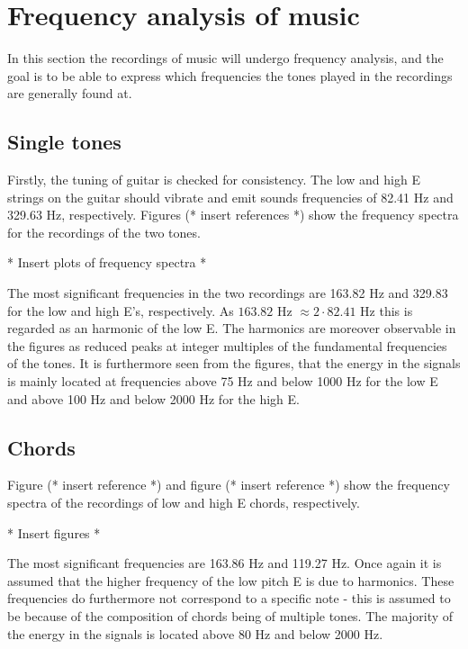 \section{Frequency analysis of music}
In this section the recordings of music will undergo frequency analysis, and the goal is to be able to express which frequencies the tones played in the recordings are generally found at.

\subsection{Single tones}\label{sec:single}
Firstly, the tuning of guitar is checked for consistency. The low and high E strings on the guitar should vibrate and emit sounds frequencies of 82.41 Hz and 329.63 Hz, respectively. Figures (* insert references *) show the frequency spectra for the recordings of the two tones.
\begin{center}
* Insert plots of frequency spectra *
\end{center}

The most significant frequencies in the two recordings are 163.82 Hz and 329.83 for the low and high E's, respectively. As $163.82$ Hz $\approx 2\cdot82.41$ Hz this is regarded as an harmonic of the low E. The harmonics are moreover observable in the figures as reduced peaks at integer multiples of the fundamental frequencies of the tones. It is furthermore seen from the figures, that the energy in the signals is mainly located at frequencies above 75 Hz and below 1000 Hz for the low E and above 100 Hz and below 2000 Hz for the high E.

\subsection{Chords}
Figure (* insert reference *) and figure (* insert reference *) show the frequency spectra of the recordings of low and high E chords, respectively.
\begin{center}
* Insert figures *
\end{center}

The most significant frequencies are 163.86 Hz and 119.27 Hz. Once again it is assumed that the higher frequency of the low pitch E is due to harmonics. These frequencies do furthermore not correspond to a specific note - this is assumed to be because of the composition of chords being of multiple tones. The majority of the energy in the signals is located above 80 Hz and below 2000 Hz.

